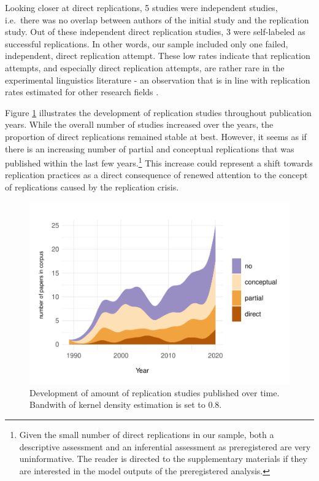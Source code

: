 \documentclass[cm,linguex]{glossa}
\begin{document}
Looking closer at direct replications, 5 studies were independent studies, i.e.~there was no overlap between authors of the initial study and the replication study.
Out of these independent direct replication studies, 3 were self-labeled as successful replications.
In other words, our sample included only one failed, independent, direct replication attempt. These low rates indicate that replication attempts, and especially direct replication attempts, are rather rare in the experimental linguistics literature - an observation that is in line with replication rates estimated for other research fields \citep{makel_replications_2012, makel_facts_2014, mueller2019replication}.

Figure \ref{fig:stream-plot} illustrates the development of replication studies throughout publication years.
While the overall number of studies increased over the years, the proportion of direct replications remained stable at best.
However, it seems as if there is an increasing number of partial and conceptual replications that was published within the last few years.\footnote{Given the small number of direct replications in our sample, both a descriptive assessment and an inferential assessment as preregistered are very uninformative. The reader is directed to the supplementary materials if they are interested in the model outputs of the preregistered analysis.}
This increase could represent a shift towards replication practices as a direct consequence of renewed attention to the concept of replications caused by the replication crisis.

\begin{figure}

{\centering \includegraphics[width=1\linewidth]{AnonymizedReplicationLing_files/figure-latex/stream-plot-1} 

}

\caption{Development of amount of replication studies published over time. Bandwith of kernel density estimation is set to 0.8.}\label{fig:stream-plot}
\end{figure}
\end{document}
